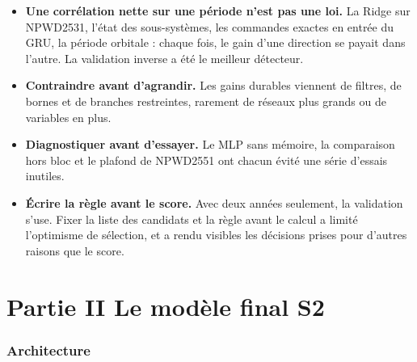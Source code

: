 \documentclass[11pt,a4paper]{article}
\begin{document}
\begin{itemize}
  \item \textbf{Une corrélation nette sur une période n'est pas une loi.} La Ridge sur NPWD2531, l'état des sous-systèmes, les commandes exactes en entrée du GRU, la période orbitale : chaque fois, le gain d'une direction se payait dans l'autre. La validation inverse a été le meilleur détecteur.
  \item \textbf{Contraindre avant d'agrandir.} Les gains durables viennent de filtres, de bornes et de branches restreintes, rarement de réseaux plus grands ou de variables en plus.
  \item \textbf{Diagnostiquer avant d'essayer.} Le MLP sans mémoire, la comparaison hors bloc et le plafond de NPWD2551 ont chacun évité une série d'essais inutiles.
  \item \textbf{Écrire la règle avant le score.} Avec deux années seulement, la validation s'use. Fixer la liste des candidats et la règle avant le calcul a limité l'optimisme de sélection, et a rendu visibles les décisions prises pour d'autres raisons que le score.
\end{itemize}

\part*{Partie II \quad Le modèle final S2}

\section{Architecture}
\end{document}
